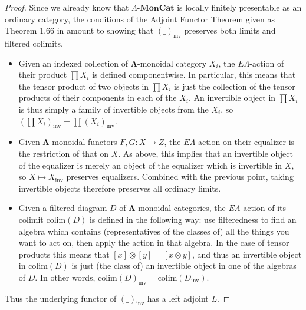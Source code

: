 \documentclass{amsbook} %
\newcommand{\mb}{\mathbf}
\newcommand{\ML}{\mathbf{\Lambda}}
\newcommand{\lmc}{\Lambda\mbox{-}\mb{MonCat}}
\numberwithin{section}{chapter}
\begin{document}
\begin{proof} Since we already know that $\lmc$ is locally finitely presentable as an ordinary category, the conditions of the Adjoint Functor Theorem given as Theorem 1.66 in \cite{ar} amount to showing that $(\_)_{\mathrm{inv}}$ preserves both limits and filtered colimits.
\begin{itemize}
\item Given an indexed collection of $\ML$-monoidal category $X_i$, the $E\Lambda$-action of their product $\prod X_i$ is defined componentwise. In particular, this means that the tensor product of two objects in $\prod X_i$ is just the collection of the tensor products of their components in each of the $X_i$. An invertible object in $\prod X_i$ is thus simply a family of invertible objects from the $X_i$, so $(\prod X_i)_{\mathrm{inv}} = \prod (X_i)_{\mathrm{inv}}$.
\item Given $\ML$-monoidal functors $F, G \colon  X \rightarrow Z$,  the $E\Lambda$-action on their equalizer is the restriction of that on $X$. As above, this implies that an invertible object of the equalizer is merely an object of the equalizer which is invertible in $X$, so $X \mapsto X_{\mathrm{inv}}$ preserves equalizers. Combined with the previous point, taking invertible objects therefore preserves all ordinary limits.
\item Given a filtered diagram $D$ of $\ML$-monoidal categories, the $E\Lambda$-action of its colimit $\mathrm{colim}(D)$ is defined in the following way: use filteredness to find an algebra which contains (representatives of the classes of) all the things you want to act on, then apply the action in that algebra. In the case of tensor products this means that $[x]\otimes[y] = [x \otimes y]$, and thus an invertible object in $\mathrm{colim}(D)$ is just (the class of) an invertible object in one of the algebras of $D$. In other words, $\mathrm{colim}(D)_{\mathrm{inv}} = \mathrm{colim}(D_{\mathrm{inv}})$.
\end{itemize}
Thus the underlying functor of $(\_)_{\mathrm{inv}}$ has a left adjoint $L$.


\end{proof}
\end{document}
